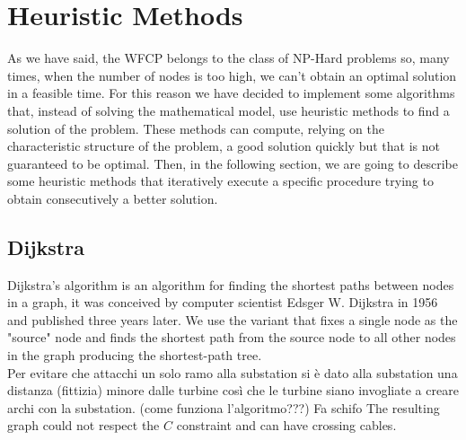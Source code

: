 
\chapter{Heuristic Methods}
\label{chp:5-Heuristic}
As we have said, the WFCP belongs to the class of NP-Hard problems so, many times, when the number of nodes is too high, we can’t obtain an optimal solution in a feasible time.
For this reason we have decided to implement some algorithms that, instead of solving the mathematical model, use heuristic methods to find a solution of the problem. These methods can compute, relying on the characteristic structure of the problem, a good solution quickly but that is not guaranteed to be optimal.
Then, in the following section, we are going to describe some heuristic methods that iteratively execute a specific procedure trying to obtain consecutively a better solution.
\section{Dijkstra}
Dijkstra's algorithm is an algorithm for finding the shortest paths between nodes in a graph, it was conceived by computer scientist Edsger W. Dijkstra in 1956 and published three years later. We use the variant that fixes a single node as the "source" node and finds the shortest path from the source node to all other nodes in the graph producing the shortest-path tree. \\
Per evitare che attacchi un solo ramo alla substation si è dato alla substation una distanza (fittizia) minore dalle turbine così che le turbine siano invogliate a creare archi con la substation.  
(come funziona l'algoritmo???)
Fa schifo
The resulting graph could not respect the $C$ constraint and can have crossing cables. 

